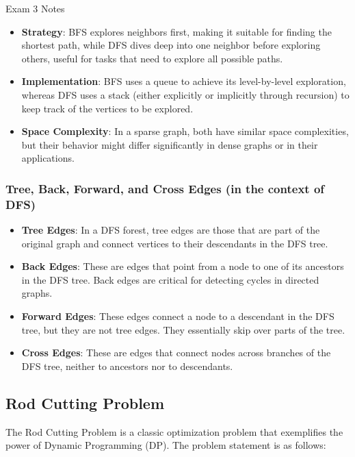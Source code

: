 \begin{examnotes}{Exam 3 Notes}
    \begin{itemize}
        \item \textbf{Strategy}: BFS explores neighbors first, making it suitable for finding the shortest path, while DFS dives deep into one neighbor before exploring others, useful for tasks that 
        need to explore all possible paths.
        \item \textbf{Implementation}: BFS uses a queue to achieve its level-by-level exploration, whereas DFS uses a stack (either explicitly or implicitly through recursion) to keep track of the 
        vertices to be explored.
        \item \textbf{Space Complexity}: In a sparse graph, both have similar space complexities, but their behavior might differ significantly in dense graphs or in their applications.
    \end{itemize}

    \subsubsection*{Tree, Back, Forward, and Cross Edges (in the context of DFS)}

    \begin{itemize}
        \item \textbf{Tree Edges}: In a DFS forest, tree edges are those that are part of the original graph and connect vertices to their descendants in the DFS tree.
        \item \textbf{Back Edges}: These are edges that point from a node to one of its ancestors in the DFS tree. Back edges are critical for detecting cycles in directed graphs.
        \item \textbf{Forward Edges}: These edges connect a node to a descendant in the DFS tree, but they are not tree edges. They essentially skip over parts of the tree.
        \item \textbf{Cross Edges}: These are edges that connect nodes across branches of the DFS tree, neither to ancestors nor to descendants.
    \end{itemize}

    \subsection*{Rod Cutting Problem}

    The Rod Cutting Problem is a classic optimization problem that exemplifies the power of Dynamic Programming (DP). The problem statement is as follows:


\end{examnotes}
